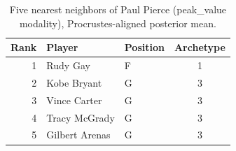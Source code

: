 \begin{table}[htbp]
  \centering\small
  \begin{tabular}{rllc}
    \toprule
    Rank & Player & Position & Archetype \\
    \midrule
    1 & Rudy Gay & F & 1 \\
    2 & Kobe Bryant & G & 3 \\
    3 & Vince Carter & G & 3 \\
    4 & Tracy McGrady & G & 3 \\
    5 & Gilbert Arenas & G & 3 \\
    \bottomrule
  \end{tabular}
  \caption{Five nearest neighbors of Paul Pierce (peak_value modality), Procrustes-aligned posterior mean.}
  \label{tab:Paul_Pierce_neighbors_peak_value}
\end{table}

